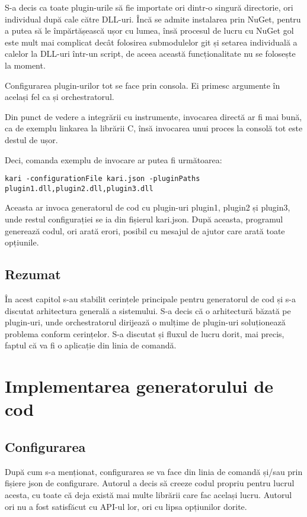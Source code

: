 \documentclass{report}
\begin{document}
S-a decis ca toate plugin-urile să fie importate ori dintr-o singură directorie, ori individual după cale către DLL-uri.
Încă se admite instalarea prin NuGet, pentru a putea să le împărtășească ușor cu lumea, însă procesul de lucru cu NuGet gol este mult mai complicat decât folosirea submodulelor git și setarea individuală a calelor la DLL-uri într-un script, de aceea această funcționalitate nu se folosește la moment.

Configurarea plugin-urilor tot se face prin consola.
Ei primesc argumente în același fel ca și orchestratorul.

Din punct de vedere a integrării cu instrumente, invocarea directă ar fi mai bună, ca de exemplu linkarea la librării C, însă invocarea unui proces la consolă tot este destul de ușor.

Deci, comanda exemplu de invocare ar putea fi următoarea:

\begin{verbatim}
kari -configurationFile kari.json -pluginPaths plugin1.dll,plugin2.dll,plugin3.dll
\end{verbatim}

Aceasta ar invoca generatorul de cod cu plugin-uri plugin1, plugin2 și plugin3, unde restul configurației se ia din fișierul kari.json.
După aceasta, programul generează codul, ori arată erori, posibil cu mesajul de ajutor care arată toate opțiunile.


\section{Rezumat}

În acest capitol s-au stabilit cerințele principale pentru generatorul de cod și s-a discutat arhitectura generală a sistemului.
S-a decis că o arhitectură băzată pe plugin-uri, unde orchestratorul dirijează o mulțime de plugin-uri soluționează problema conform cerințelor.
S-a discutat și fluxul de lucru dorit, mai precis, faptul că va fi o aplicație din linia de comandă.


\chapter{Implementarea generatorului de cod}

\section{Configurarea}

După cum s-a menționat, configurarea se va face din linia de comandă și/sau prin fișiere json de configurare.
Autorul a decis să creeze codul propriu pentru lucrul acesta, cu toate că deja există mai multe librării care fac același lucru.
Autorul ori nu a fost satisfăcut cu API-ul lor, ori cu lipsa opțiunilor dorite.
\end{document}
